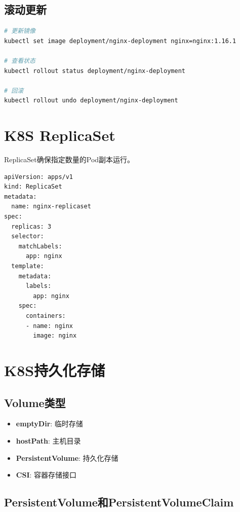 \documentclass[12pt,UTF8]{ctexbook}
\begin{document}
\subsection{滚动更新}

\begin{lstlisting}[language=bash]
# 更新镜像
kubectl set image deployment/nginx-deployment nginx=nginx:1.16.1

# 查看状态
kubectl rollout status deployment/nginx-deployment

# 回滚
kubectl rollout undo deployment/nginx-deployment
\end{lstlisting}

\section{K8S ReplicaSet}
\label{sec:k8s-replicaset}

ReplicaSet确保指定数量的Pod副本运行。

\begin{lstlisting}
apiVersion: apps/v1
kind: ReplicaSet
metadata:
  name: nginx-replicaset
spec:
  replicas: 3
  selector:
    matchLabels:
      app: nginx
  template:
    metadata:
      labels:
        app: nginx
    spec:
      containers:
      - name: nginx
        image: nginx
\end{lstlisting}

\section{K8S持久化存储}
\label{sec:k8s-storage}

\subsection{Volume类型}

\begin{itemize}
    \item \textbf{emptyDir}: 临时存储
    \item \textbf{hostPath}: 主机目录
    \item \textbf{PersistentVolume}: 持久化存储
    \item \textbf{CSI}: 容器存储接口
\end{itemize}

\subsection{PersistentVolume和PersistentVolumeClaim}
\end{document}
